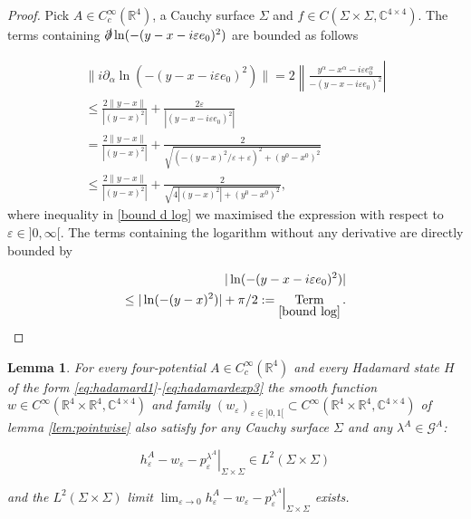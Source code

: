 \documentclass[b5paper,draft,openbib,12pt]{memoir}
\newtheorem{Lemma}[Def]{Lemma}
\DeclareMathOperator{\term}{Term}
\begin{document}
\begin{proof}
Pick \(A\in C_c^\infty(\mathbb{R}^4)\), a Cauchy surface \(\Sigma\) and \(f\in C(\Sigma\times\Sigma,\mathbb{C}^{4\times 4})\).
The terms containing \(\slashed{\partial}\ln(-(y-x-i\varepsilon e_0)^2)\) are bounded as follows

\begin{align}
\|i\partial_\alpha\ln(-(y-x-i\varepsilon e_0)^2)\|=2\left\| \frac{y^\alpha-x^\alpha-i\varepsilon e_0^\alpha}{-(y-x-i\varepsilon e_0)^2}\right|\\
\le \frac{2\|y-x\|}{|(y-x)^2|} + \frac{2\varepsilon}{|(y-x-i\varepsilon e_0)^2|}\\
=\frac{2\|y-x\|}{|(y-x)^2|} + \frac{2}{\sqrt{(-(y-x)^2/\varepsilon + \varepsilon)^2 +(y^0-x^0)^2}}\\\label{bound d log}
\le \frac{2\|y-x\|}{|(y-x)^2|} + \frac{2}{\sqrt{4|(y-x)^2| + (y^0-x^0)^2}}, 
\end{align}
where inequality  in \eqref{bound d log} we maximised the expression with respect to \(\varepsilon \in ]0,\infty[\). 
The terms containing the logarithm without
any derivative are directly bounded by

\begin{align}\nonumber
|\ln(-(y-x-i\varepsilon e_0)^2)|&\\\label{bound log}\le |\ln(-(y-x)^2)| +\pi/2:=\term_{\eqref{bound log}}.
\end{align}
\end{proof}



\begin{Lemma}\label{lem:Hadamard=>Pol}
For every four-potential \(A\in C_c^\infty (\mathbb{R}^4)\) and every Hadamard
state \(H\) of the form \eqref{eq:hadamard1}-\eqref{eq:hadamardexp3} the  
smooth function \(w\in C^\infty(\mathbb{R}^4\times \mathbb{R}^4,\mathbb{C}^{4\times 4})\) and family 
\((w_\varepsilon)_{\varepsilon \in ]0,1[ }\subset C^\infty(\mathbb{R}^4\times \mathbb{R}^4,\mathbb{C}^{4\times4})\) of lemma \ref{lem:pointwise} also satisfy for any
  Cauchy surface \(\Sigma\) and any \(\lambda^A\in\mathcal{G}^A\):

\begin{equation}
\left.h_\varepsilon^A-w_\varepsilon-p^{\lambda^A}_\varepsilon \right|_{\Sigma\times\Sigma} \in L^2(\Sigma\times\Sigma)
\end{equation}

and the \(L^2(\Sigma\times\Sigma)\) limit \(\lim_{\varepsilon\rightarrow 0} \left.h_\varepsilon^A-w_\varepsilon-p^{\lambda^A}_\varepsilon \right|_{\Sigma\times\Sigma}\) exists.
\end{Lemma}
\end{document}
